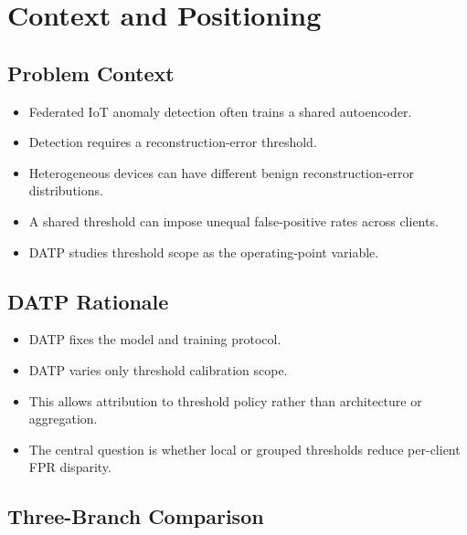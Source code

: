 
\section{Context and Positioning}

\subsection{Problem Context}

\begin{itemize}
  \item Federated IoT anomaly detection often trains a shared autoencoder.
  \item Detection requires a reconstruction-error threshold.
  \item Heterogeneous devices can have different benign reconstruction-error distributions.
  \item A shared threshold can impose unequal false-positive rates across clients.
  \item DATP studies threshold scope as the operating-point variable.
\end{itemize}

\subsection{DATP Rationale}

\begin{itemize}
  \item DATP fixes the model and training protocol.
  \item DATP varies only threshold calibration scope.
  \item This allows attribution to threshold policy rather than architecture or aggregation.
  \item The central question is whether local or grouped thresholds reduce per-client FPR disparity.
\end{itemize}

\subsection{Three-Branch Comparison}

